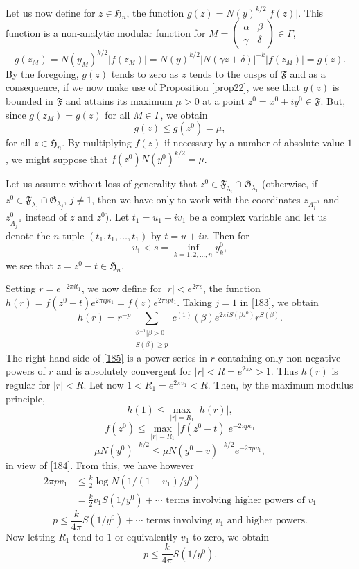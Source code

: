 Let us now define for $z\in\mathfrak{H}_{n}$, the function
$g(z)=N(y)^{k/2}|f(z)|$. This function is a non-analytic modular
function \ie for $M=\left(\begin{smallmatrix} \alpha & \beta\\ \gamma
  & \delta\end{smallmatrix}\right)\in \Gamma$,
$$
g(z_{M})=N(y_{M})^{k/2}|f(z_{M})|=N(y)^{k/2}|N(\gamma
z+\delta)|^{-k}|f(z_{M})|=g(z). 
$$
By the foregoing, $g(z)$ tends to zero as $z$ tends to the cusps of
$\mathfrak{F}$ and as a consequence, if we now make use of Proposition
\ref{prop22}, we see that $g(z)$ is bounded in $\mathfrak{F}$ and
attains its maximum $\mu>0$ at a point
$z^{0}=x^{0}+iy^{0}\in\mathfrak{F}$. But, since $g(z_{M})=g(z)$ for
all $M\in\Gamma$, we obtain
\begin{equation*}
g(z)\leq g(z^{0})=\mu,\tag{184}\label{184}
\end{equation*}
for all $z\in\mathfrak{H}_{n}$. By multiplying $f(z)$ if necessary by
a number of absolute value $1$, we might suppose that
$f(z^{0})N(y^{0})^{k/2}=\mu$.

Let us assume without loss of generality that
$z^{0}\in\mathfrak{F}_{\lambda_{i}}\cap \mathfrak{G}_{\lambda_{1}}$
(otherwise, if $z^{0}\in\mathfrak{F}_{\lambda_{j}}\cap
\mathfrak{G}_{\lambda_{j}}$, $j\neq 1$, then we have only to work with
the coordinates $z_{A^{-1}_{j}}$ and $z^{0}_{A^{-1}_{j}}$ instead of
$z$ and $z^{0}$). Let $t_{1}=u_{1}+iv_{1}$ be a complex variable and
let us denote the $n$-tuple $(t_{1},t_{1},\ldots,t_{1})$ by
$t=u+iv$. Then for 
$$
v_{1}<s=\inf\limits_{k=1,2,\ldots,n}y^{0}_{k},
$$\pageoriginale
we see that $z=z^{0}-t\in\mathfrak{H}_{n}$.

Setting $r=e^{-2\pi it_{1}}$, we now define for $|r|<e^{2\pi s}$, the
function $h(r)=f(z^{0}-t)e^{2\pi ipt_{1}}=f(z)e^{2\pi
  ipt_{1}}$. Taking $j=1$ in \eqref{183}, we obtain
\begin{equation*}
h(r)=r^{-p}\sum_{\substack{\vartheta^{-1}|\beta>0\\ S(\beta)\geq
    p}}c^{(1)}(\beta)e^{2\pi iS(\beta z^{0})}r^{S(\beta)}.\tag{185}\label{185}
\end{equation*}
The right hand side of \eqref{185} is a power series in $r$ containing
only non-negative powers of $r$ and is absolutely convergent for
$|r|<R=e^{2\pi s}>1$. Thus $h(r)$ is regular for $|r|<R$. Let now
$1<R_{1}=e^{2\pi v_{1}}<R$. Then, by the maximum modulus principle,
$$
h(1)\leq\max\limits_{|r|=R_{1}}|h(r)|,
$$
\ie
$$
f(z^{0})\leq \max\limits_{|r|=R_{1}}|f(z^{0}-t)|e^{-2\pi pv_{1}}
$$
\ie
$$
\mu N(y^{0})^{-k/2}\leq \mu N(y^{0}-v)^{-k/2}e^{-2\pi pv_{1}},
$$
in view of \eqref{184}. From this, we have however
\begin{align*}
2\pi pv_{1} &\leq \frac{k}{2}\log N(1/(1-v_{1})/y^{0})\\
&= \frac{k}{2}v_{1}S(1/y^{0})+\cdots\text{ terms involving higher
  powers of } v_{1}
\end{align*}
\ie
$$
p\leq \frac{k}{4\pi}S(1/y^{0})+\cdots\text{ terms involving } v_{1}
\text{ and higher powers.}
$$
Now letting $R_{1}$ tend to $1$ or equivalently $v_{1}$ to zero, we
obtain
$$
p\leq \frac{k}{4\pi}S(1/y^{0}).
$$

